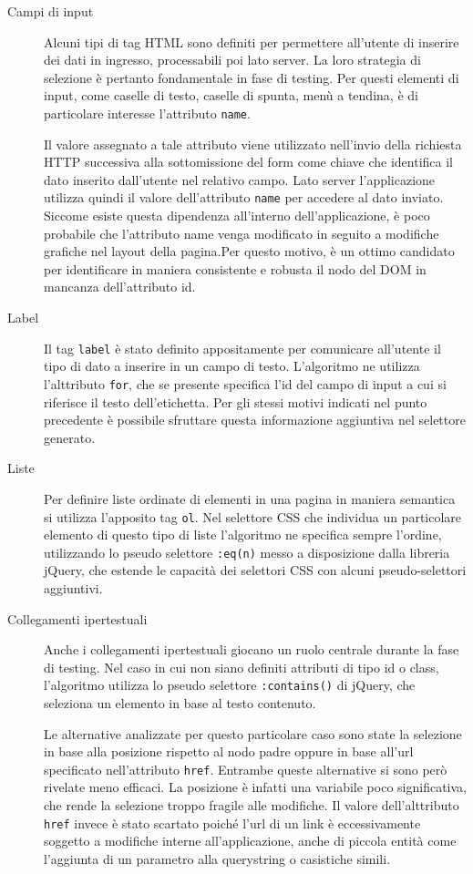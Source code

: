 \documentclass[12pt]{toptesi}
\begin{document}
\begin{description}
\item[Campi di input] Alcuni tipi di tag HTML sono definiti per permettere all'utente di inserire dei dati in ingresso, processabili poi lato server. La loro strategia di selezione è pertanto fondamentale in fase di testing. Per questi elementi di input, come caselle di testo, caselle di spunta, menù a tendina, è di particolare interesse l'attributo \verb|name|. 

Il valore assegnato a tale attributo viene utilizzato nell'invio della richiesta HTTP successiva alla sottomissione del form come chiave che identifica il dato inserito dall'utente nel relativo campo. Lato server l'applicazione utilizza quindi il valore dell'attributo \verb|name| per accedere al dato inviato. Siccome esiste questa dipendenza all'interno dell'applicazione, è poco probabile che l'attributo name venga modificato in seguito a modifiche grafiche nel layout della pagina.Per questo motivo, è un ottimo candidato per identificare in maniera consistente e robusta il nodo del DOM in mancanza dell'attributo id.

\item[Label] Il tag \verb|label| è stato definito appositamente per comunicare all'utente il tipo di dato a inserire in un campo di testo. L'algoritmo ne utilizza l'alttributo \verb|for|, che se presente specifica l'id del campo di input a cui si riferisce il testo dell'etichetta. Per gli stessi motivi indicati nel punto precedente è possibile sfruttare questa informazione aggiuntiva nel selettore generato.

\item[Liste] Per definire liste ordinate di elementi in una pagina in maniera semantica si utilizza l'apposito tag \verb|ol|. Nel selettore CSS che individua un particolare elemento di questo tipo di liste l'algoritmo ne specifica sempre l'ordine, utilizzando lo pseudo selettore \verb|:eq(n)| messo a disposizione dalla libreria jQuery, che estende le capacità dei selettori CSS con alcuni pseudo-selettori aggiuntivi.

\item[Collegamenti ipertestuali] Anche i collegamenti ipertestuali giocano un ruolo centrale durante la fase di testing. Nel caso in cui non siano definiti attributi di tipo id o class, l'algoritmo utilizza lo pseudo selettore \verb|:contains()| di jQuery, che seleziona un elemento in base al testo contenuto.

Le alternative analizzate per questo particolare caso sono state la selezione in base alla posizione rispetto al nodo padre oppure in base all'url specificato nell'attributo \verb|href|. Entrambe queste alternative si sono però rivelate meno efficaci. La posizione è infatti una variabile poco significativa, che rende la selezione troppo fragile alle modifiche. Il valore dell'alttributo \verb|href| invece è stato scartato poiché l'url di un link è eccessivamente soggetto a modifiche interne all'applicazione, anche di piccola entità come l'aggiunta di un parametro alla querystring o casistiche simili.

\end{description}
\end{document}
